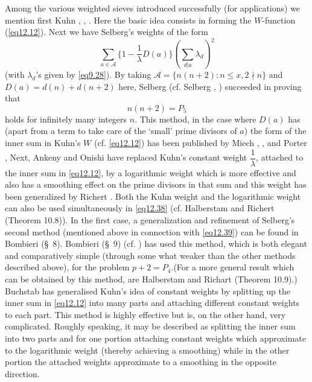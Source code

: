 Among the various weighted sieves introduced successfully (for
applications) we mention first Kuhn \cite{key1}, \cite{key2},
\cite{key3}. Here the basic idea 
consists in forming the $W$-function (\eqref{eq12.12}). Next we have
Selberg's weights of the form 
\begin{equation*}
\sum_{a \in \mathscr{A}}\bigg \{1-\frac{1}{\lambda}D(a)\bigg
\}(\sum_{d|a} \lambda_d)^2 \tag{12.38}\label{eq12.38} 
\end{equation*}
(with  $\lambda_d$'s given by \eqref{eq9.28}). By taking
$\mathscr{A}=\{n(n+2): n \leq x,2 \nmid n \}$ and $D(a)=d(n)+d(n+2)$
here, Selberg \cite{key2} (cf. Selberg \cite{key4}, \cite{key5})
succeeded in proving that 
\begin{equation*}
n(n+2)=P_5 \tag{12.39}\label{eq12.39}
\end{equation*}
holds for infinitely many integers $n$. This method, in the case where
$D(a)$ has (apart from a term to take care of the `small' prime
divisors of $a$) the form of the inner sum in Kuhn's $W$ (cf. \eqref{eq12.12})
has been published by Miech \cite{key1}, \cite{key2}, and Porter
\cite{key1}, Next, Ankeny and Onishi \cite{key1} have replaced Kuhn's
constant weight 
$\dfrac{1}{\lambda}$, attached to the inner sum in \eqref{eq12.12}, by a
logarithmic weight which is more effective and also has a smoothing
effect on the prime divisors in that sum and this weight has been
generalized by Richert \cite{key1}. Both the Kuhn weight and the logarithmic
weight can also be used simultaneously in \eqref{eq12.38} (cf. Halberstam
and Richert \cite{key1} (Theorem 10.8)). In the first case, a
generalization and refinement of Selberg's second method (mentioned
above in connection with \eqref{eq12.39}) can be found in Bombieri
\cite{key6} (\S\ 8). Bombieri \cite{key6} (\S\ 9) (cf. \cite{key8})
has used this 
method, which is both elegant and comparatively simple (through some
what weaker than the other methods described above), for the problem
$p+2=P_4$.\pageoriginale (For a more general result which can be
obtained by this 
method, are Halberstam and Richart \cite{key1} (Theorem 10.9).) Buchstab
\cite{key2} has generalised Kuhn's idea of constant weights by splitting up
the inner sum in \eqref{eq12.12} into many parts and attaching different
constant weights to each part. This method is highly effective but is,
on the other hand, very complicated. Roughly speaking, it may be
described as splitting the inner sum into two parts and for one
portion attaching constant weights which approximate to the
logarithmic weight (thereby achieving a smoothing) while in the other
portion the attached weights approximate to a smoothing in the
opposite direction. 

